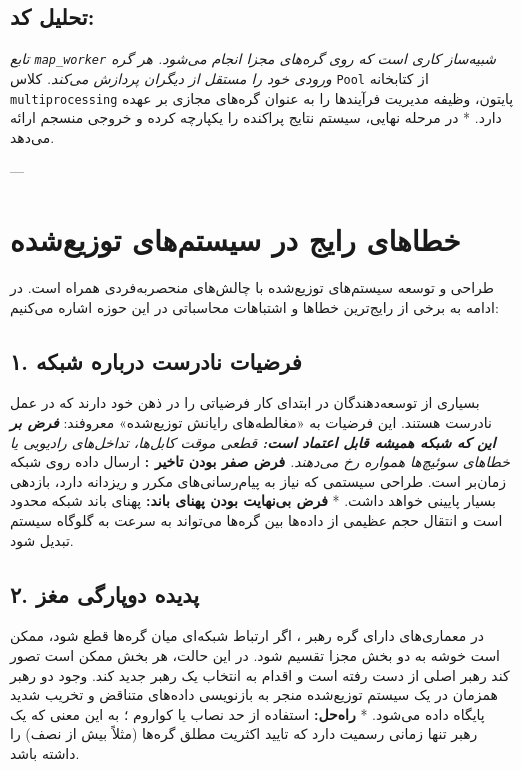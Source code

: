 \documentclass[12pt,a4paper,openany]{book}
\begin{document}
\subsection{تحلیل کد:}

\textit{ تابع \texttt{map\_worker} شبیه‌ساز کاری است که روی گره‌های مجزا انجام می‌شود. هر گره ورودی خود را مستقل از دیگران پردازش می‌کند. } کلاس \texttt{Pool} از کتابخانه \texttt{multiprocessing} پایتون، وظیفه مدیریت فرآیندها  را به عنوان گره‌های مجازی بر عهده دارد. * در مرحله نهایی، سیستم نتایج پراکنده را یکپارچه کرده و خروجی منسجم ارائه می‌دهد.

---

\section{خطاهای رایج در سیستم‌های توزیع‌شده}

طراحی و توسعه سیستم‌های توزیع‌شده با چالش‌های منحصر‌به‌فردی همراه است. در ادامه به برخی از رایج‌ترین خطاها و اشتباهات محاسباتی در این حوزه اشاره می‌کنیم:

\subsection{۱. فرضیات نادرست درباره شبکه }

بسیاری از توسعه‌دهندگان در ابتدای کار فرضیاتی را در ذهن خود دارند که در عمل نادرست هستند. این فرضیات به «مغالطه‌های رایانش توزیع‌شده» معروفند: \textit{ \textbf{فرض بر این که شبکه همیشه قابل اعتماد است:} قطعی موقت کابل‌ها، تداخل‌های رادیویی یا خطاهای سوئیچ‌ها همواره رخ می‌دهند. } \textbf{فرض صفر بودن تاخیر :} ارسال داده روی شبکه زمان‌بر است. طراحی سیستمی که نیاز به پیام‌رسانی‌های مکرر و ریزدانه  دارد، بازدهی بسیار پایینی خواهد داشت. * \textbf{فرض بی‌نهایت بودن پهنای باند:} پهنای باند شبکه محدود است و انتقال حجم عظیمی از داده‌ها بین گره‌ها می‌تواند به سرعت به گلوگاه  سیستم تبدیل شود.

\subsection{۲. پدیده دوپارگی مغز }

در معماری‌های دارای گره رهبر ، اگر ارتباط شبکه‌ای میان گره‌ها قطع شود، ممکن است خوشه به دو بخش مجزا تقسیم شود. در این حالت، هر بخش ممکن است تصور کند رهبر اصلی از دست رفته است و اقدام به انتخاب یک رهبر جدید کند. وجود دو رهبر همزمان در یک سیستم توزیع‌شده منجر به بازنویسی داده‌های متناقض و تخریب شدید پایگاه داده می‌شود. * \textbf{راه‌حل:} استفاده از حد نصاب یا کواروم ؛ به این معنی که یک رهبر تنها زمانی رسمیت دارد که تایید اکثریت مطلق گره‌ها (مثلاً بیش از نصف) را داشته باشد.
\end{document}
